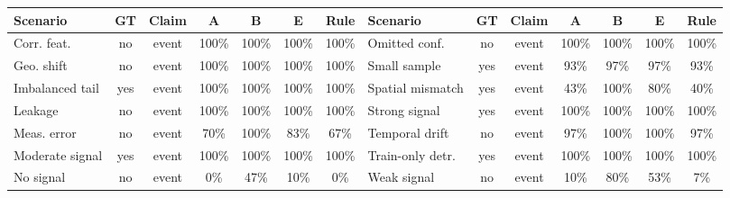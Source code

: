 \begin{tabular}{@{}lcccccc@{\hspace{1.4em}}lcccccc@{}}
\toprule
Scenario & GT & Claim & A & B & E & Rule &
Scenario & GT & Claim & A & B & E & Rule \\
\midrule
Corr. feat. & no & event & 100\% & 100\% & 100\% & 100\% &
Omitted conf. & no & event & 100\% & 100\% & 100\% & 100\% \\
Geo. shift & no & event & 100\% & 100\% & 100\% & 100\% &
Small sample & yes & event & 93\% & 97\% & 97\% & 93\% \\
Imbalanced tail & yes & event & 100\% & 100\% & 100\% & 100\% &
Spatial mismatch & yes & event & 43\% & 100\% & 80\% & 40\% \\
Leakage & no & event & 100\% & 100\% & 100\% & 100\% &
Strong signal & yes & event & 100\% & 100\% & 100\% & 100\% \\
Meas. error & no & event & 70\% & 100\% & 83\% & 67\% &
Temporal drift & no & event & 97\% & 100\% & 100\% & 97\% \\
Moderate signal & yes & event & 100\% & 100\% & 100\% & 100\% &
Train-only detr. & yes & event & 100\% & 100\% & 100\% & 100\% \\
No signal & no & event & 0\% & 47\% & 10\% & 0\% &
Weak signal & no & event & 10\% & 80\% & 53\% & 7\% \\
\bottomrule
\end{tabular}
